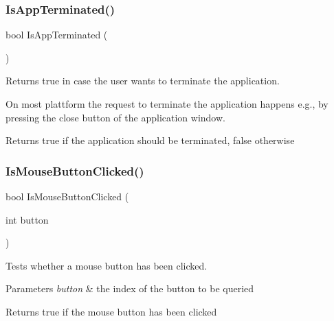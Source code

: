 \subsubsection{\texorpdfstring{Is\+App\+Terminated()}{IsAppTerminated()}}
{\footnotesize\ttfamily bool Is\+App\+Terminated (\begin{DoxyParamCaption}{ }\end{DoxyParamCaption})}

Returns {\ttfamily true} in case the user want\textquotesingle{}s to terminate the application.

On most plattform the request to terminate the application happens e.\+g., by pressing the close button of the application window.

\begin{DoxyReturn}{Returns}
{\ttfamily true} if the application should be terminated, {\ttfamily false} otherwise 
\end{DoxyReturn}
\mbox{\label{group__sdl__group_ga8f17cac7776ed1c12041101c8abb740b}} 
\subsubsection{\texorpdfstring{Is\+Mouse\+Button\+Clicked()}{IsMouseButtonClicked()}}
{\footnotesize\ttfamily bool Is\+Mouse\+Button\+Clicked (\begin{DoxyParamCaption}\item[{int}]{button }\end{DoxyParamCaption})}

Tests whether a mouse button has been clicked.


\begin{DoxyParams}{Parameters}
{\em button} & the index of the button to be queried \\
\hline
\end{DoxyParams}
\begin{DoxyReturn}{Returns}
{\ttfamily true} if the mouse button has been clicked 
\end{DoxyReturn}
\mbox{\label{group__sdl__group_ga2537bad9d6f115fee49a741e7e2623a6}} 
